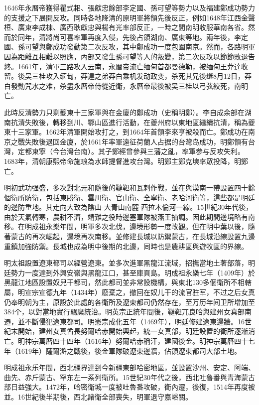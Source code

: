 1646年永曆帝獲得瞿式耜、張獻忠餘部李定國、孫可望等勢力以及福建鄭成功勢力的支援之下展開反攻。同時各地降清的原明軍將領先後反正，例如1648年江西金聲桓、廣東李成棟、廣西耿獻忠與楊有光率部反正，一時之間南明收服華南各省。然而於同年，清將尚可喜率軍再度入侵，先後占領湖南、廣東等地。兩年後，李定國、孫可望與鄭成功發動第二次反攻，其中鄭成功一度包圍南京。然而，各路明軍因為距離互相難以照應，內部又發生孫可望等人的叛變，第二次反攻以節節敗退告終。1661年，清軍三路攻入云南，永曆帝流亡缅甸首都曼德勒，被缅甸王莽達收留。後吴三桂攻入缅甸，莽達之弟莽白乘机发动政变，杀死其兄後继8月12日，莽白發動咒水之难，杀盡永曆帝侍從近衛，永曆帝最後被吴三桂以弓弦絞死，南明亡。

此時反清勢力只剩夔東十三家軍與在金廈的鄭成功（史稱明鄭）。李自成余部在湖南抗清失敗後，轉移到川、鄂山區進行活動，在夔州府以東地區繼續抗清，稱為夔東十三家軍。1662年清軍開始攻打之，到1664年首領李來亨被殺而亡。鄭成功在南京之戰失敗後退回金廈，於1661年率軍遠征荷蘭人占据的台灣岛成功，明鄭領有台灣，定都東寧（今台灣台南）。其子鄭經曾參與三藩之亂，率軍参与反攻失利。1683年，清朝康熙帝命施琅為水師提督進攻台灣。明鄭主鄭克塽率眾投降，明鄭亡。

明初武功强盛，多次對北元和隨後的韃靼和瓦剌作戰，並在與漠南一帶設置四十餘個衛所防衛，包括東勝衛、雲川衛、官山衛、全寧衛、老哈河衛等，這些都是明廷的邊防重地。其走向大致為陰山-大青山南麓-西拉木倫河一線。15世紀30年代後，由於天氣轉寒，農耕不濟，靖難之役時邊塞軍隊被燕王抽調。因此期間邊境略有南移。在明成祖永樂年間，明軍多次北伐，邊境形勢一度改觀。但在明中葉以後，隨著蒙古的再次崛起，邊境再次南移。並修建長城以防禦蒙古，在長城沿線設置九邊重鎮加強防禦。長城也成為明中後期的北邊，同時也是農耕區與遊牧區的界線。

明太祖設置遼東都司以經營遼東。並多次進軍黑龍江流域，招撫當地土著部落，明廷勢力一度達到外興安嶺與黑龍江口，甚至庫頁島。明成祖永樂七年（1409年）於黑龍江地區設置奴兒干都司，然此都司並非常設機構，與東北130多個衛所不相轄屬，明宣宗宣德九年（1434年）廢棄之，撤回在奴儿干的流官驻军，不过之后女真仍奉明朝为主，原設於此處的各衛所及遼東都司仍然存在，至万历年间卫所增加至384个，以對當地實行羈縻統治。明英宗正統年間後，韃靼兀良哈與建州女真部南遷，並不斷侵犯遼東都司。明憲宗成化五年（1469年），明廷修建遼東邊牆。16世紀末開始，建州女真酋長努爾哈赤開始興起，統一女真部，明廷設置的衛所逐漸消亡。明神宗萬曆四十四年（1616年）努爾哈赤稱汗，建國後金。明神宗萬曆四十七年（1619年）薩爾滸之戰後，後金軍隊破遼東邊牆，佔領遼東都司大部土地。

明成祖永乐年間，西北疆界達到今新疆東部哈密地區，並設置沙州、安定、阿端、曲先、赤斤蒙古、罕东左一系列衛所。15世紀30年代之後，西北吐魯番與青海蒙古部日益強大。1472年，哈密衛城一度被吐魯番攻破，衛內遷，後復，1514年再度被並。16世紀後半期後，西北諸衛全部喪失，明軍退守嘉峪關。

